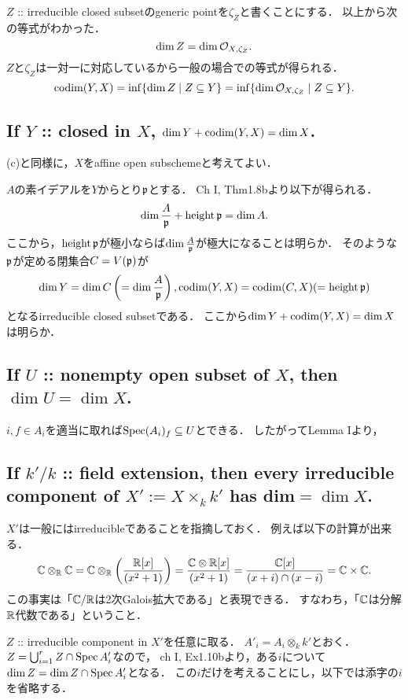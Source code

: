 \documentclass[a4paper]{jsarticle}
\begin{document}
    $Z$ :: irreducible closed subsetのgeneric pointを$\zeta_Z$と書くことにする．
    以上から次の等式がわかった．
    \[ \dim Z=\dim \mathcal{O}_{X,\zeta_Z}. \]
    $Z$と$\zeta_Z$は一対一に対応しているから一般の場合での等式が得られる．
    \[
        \operatorname{codim}(Y,X)
        =\inf \{ \dim Z \mid Z \subseteq Y \}
        =\inf \{ \dim \mathcal{O}_{X,\zeta_Z} \mid Z \subseteq Y \}.
    \]

    \subsection{If $Y$ :: closed in $X$, $\dim Y+\operatorname{codim}(Y,X)=\dim X$.}
    (c)と同様に，$X$をaffine open subschemeと考えてよい．

    $A$の素イデアルを$Y$からとり$\mathfrak{p}$とする．
    Ch I, Thm1.8bより以下が得られる．
    \[ \dim \frac{A}{\mathfrak{p}}+\operatorname{height} \mathfrak{p}=\dim A. \]
    ここから，$\operatorname{height} \mathfrak{p}$が極小ならば$\dim \frac{A}{\mathfrak{p}}$が極大になることは明らか．
    そのような$\mathfrak{p}$が定める閉集合$C=V(\mathfrak{p})$が
    \[ \dim Y=\dim C\left(=\dim \frac{A}{\mathfrak{p}}\right), \operatorname{codim} (Y,X)=\operatorname{codim}(C,X)(=\operatorname{height} \mathfrak{p}) \]
    となるirreducible closed subsetである．
    ここから$\dim Y+\operatorname{codim}(Y,X)=\dim X$は明らか．

    \subsection{If $U$ :: nonempty open subset of $X$, then $\dim U = \dim X$.}
    $i, f \in A_i$を適当に取れば$\operatorname{Spec} (A_i)_f \subseteq U$とできる．
    したがってLemma Iより，

    \subsection{If $k'/k$ :: field extension, then every irreducible component of $X':=X \times_k k'$ has dim$=\dim X$.}
    $X'$は一般にはirreducibleであることを指摘しておく．
    例えば以下の計算が出来る．
    \[
        \mathbb{C} \otimes_{\mathbb{R}} \mathbb{C}
        =\mathbb{C} \otimes_{\mathbb{R}} \left(\frac{\mathbb{R}[x]}{(x^2+1)}\right)
        =\frac{\mathbb{C} \otimes \mathbb{R}[x]}{(x^2+1)}
        =\frac{\mathbb{C}[x]}{(x+i) \cap (x-i)}
        =\mathbb{C} \times \mathbb{C}.
    \]
    この事実は「$\mathbb{C}/\mathbb{R}$は2次Galois拡大である」と表現できる．
    すなわち，「$\mathbb{C}$は分解$\mathbb{R}$代数である」ということ．

    $Z$ :: irreducible component in $X'$を任意に取る．
    $A'_i=A_i \otimes_k k'$とおく．
    $Z=\bigcup_{i=1}^r Z \cap \operatorname{Spec} A'_i$なので，
    ch I, Ex1.10bより，ある$i$について$\dim Z=\dim Z \cap \operatorname{Spec} A'_i$となる．
    この$i$だけを考えることにし，以下では添字の$i$を省略する．
\end{document}
